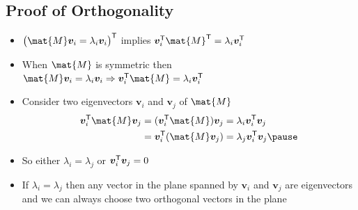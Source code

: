 \documentclass[25pt,landscape,footrule]{foils}
\begin{document}
\begin{slide}
\section[-2]{Proof of Orthogonality}

\begin{PauseHighLight}
  \begin{itemize}
  \item $\left(\strut \mat{M}\bm{v}_i = \lambda_i\bm{v}_i\right)^\tr$
    implies $\bm{v}_i^\tr \mat{M}^\tr = \lambda_i\bm{v}_i^\tr$\pause
  \item When $\mat{M}$ is symmetric then $\mat{M}\bm{v}_i = \lambda_i\bm{v}_i
    \Rightarrow \bm{v}_i^\tr \mat{M} = \lambda_i\bm{v}_i^\tr$\pause
  \item Consider two eigenvectors $\bm{v}_i$ and $\bm{v}_j$ of $\mat{M}$
    \begin{align*}
      \bm{v}_i^\tr \mat{M} \bm{v}_j &= (\bm{v}_i^\tr \mat{M}) \bm{v}_j =
      \lambda_i  \bm{v}_i^\tr \bm{v}_j \\
      &= \bm{v}_i^\tr (\mat{M} \bm{v}_j)
      = \lambda_j  \bm{v}_i^\tr \bm{v}_j\pause
    \end{align*}
  \item So either $\lambda_i = \lambda_j$ or $\bm{v}_i^{\textsf{T}} \bm{v}_j=0$\pause
  \item If $\lambda_i = \lambda_j$ then any vector in the plane spanned
    by $\bm{v}_i$ and $\bm{v}_j$ are eigenvectors and we can always
    choose two orthogonal vectors in the plane\pause
  \end{itemize}
\end{PauseHighLight}

\end{slide}


\end{document}
